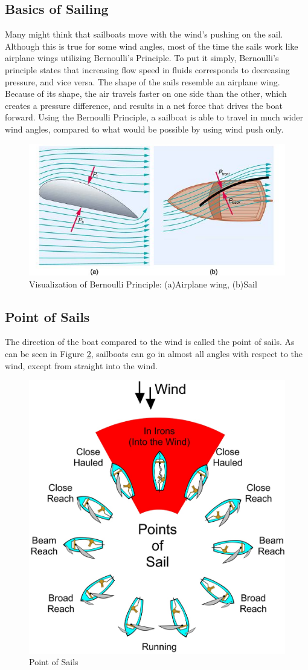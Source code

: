 \documentclass[12pt,twoside]{report}
\begin{document}
\subsection{Basics of Sailing}
Many might think that sailboats move with the wind's pushing on the sail. Although this is true for some wind angles, most of the time the sails work like airplane wings utilizing Bernoulli's Principle. To put it simply, Bernoulli's principle \cite{wiki:bernoulli} states that increasing flow speed in fluids corresponds to decreasing pressure, and vice versa. The shape of the sails resemble an airplane wing. Because of its shape, the air travels faster on one side than the other, which creates a pressure difference, and results in a net force that drives the boat forward. Using the Bernoulli Principle, a sailboat is able to travel in much wider wind angles, compared to what would be possible by using wind push only.

\begin{figure}[h]
\centering
\includegraphics[width = 0.6\hsize]{figures/sailing/sail-bernoulli.jpg}
\caption{Visualization of Bernoulli Principle: (a)Airplane wing, (b)Sail \cite{bernoulli}}
\label{fig:bernoulli}
\end{figure}

\subsection{Point of Sails}
The direction of the boat compared to the wind is called the point of sails. As can be seen in Figure \ref{fig:points-of-sail}, sailboats can go in almost all angles with respect to the wind, except from straight into the wind.

\begin{figure}[h]
\centering
\includegraphics[width = 0.55\hsize]{figures/sailing/PointsOfSail.png}
\caption{Point of Sails \cite{img:sailing-tack-gybe}}
\label{fig:points-of-sail}
\end{figure}
\end{document}
